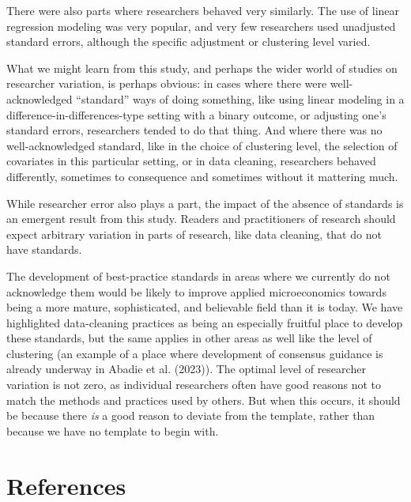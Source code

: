 \documentclass[
  letterpaper,
  DIV=11,
  numbers=noendperiod]{scrartcl}
\begin{document}
There were also parts where researchers behaved very similarly. The use
of linear regression modeling was very popular, and very few researchers
used unadjusted standard errors, although the specific adjustment or
clustering level varied.

What we might learn from this study, and perhaps the wider world of
studies on researcher variation, is perhaps obvious: in cases where
there were well-acknowledged ``standard'' ways of doing something, like
using linear modeling in a difference-in-differences-type setting with a
binary outcome, or adjusting one's standard errors, researchers tended
to do that thing. And where there was no well-acknowledged standard,
like in the choice of clustering level, the selection of covariates in
this particular setting, or in data cleaning, researchers behaved
differently, sometimes to consequence and sometimes without it mattering
much.

While researcher error also plays a part, the impact of the absence of
standards is an emergent result from this study. Readers and
practitioners of research should expect arbitrary variation in parts of
research, like data cleaning, that do not have standards.

The development of best-practice standards in areas where we currently
do not acknowledge them would be likely to improve applied
microeconomics towards being a more mature, sophisticated, and
believable field than it is today. We have highlighted data-cleaning
practices as being an especially fruitful place to develop these
standards, but the same applies in other areas as well like the level of
clustering (an example of a place where development of consensus
guidance is already underway in Abadie et al. (2023)). The optimal level
of researcher variation is not zero, as individual researchers often
have good reasons not to match the methods and practices used by others.
But when this occurs, it should be because there \emph{is} a good reason
to deviate from the template, rather than because we have no template to
begin with.

\hypertarget{references}{%
\section*{References}\label{references}}
\end{document}
